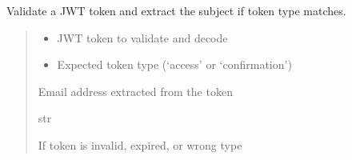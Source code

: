 \documentclass[letterpaper,10pt,openany,oneside,english]{sphinxmanual}
\begin{document}

\begin{savenotes}\begin{fulllineitems}
\label{\detokenize{modules/security:storeapi.security.get_subject_for_token_type}}
\pysigstartsignatures
{}
\pysigstopsignatures
\sphinxAtStartPar
Validate a JWT token and extract the subject if token type matches.
\begin{quote}\begin{description}
\begin{itemize}
\item {} 
\sphinxAtStartPar
{} \textendash{} JWT token to validate and decode

\item {} 
\sphinxAtStartPar
{} \textendash{} Expected token type (‘access’ or ‘confirmation’)

\end{itemize}

\sphinxAtStartPar
Email address extracted from the token

\sphinxAtStartPar
str

\sphinxAtStartPar
{} \textendash{} If token is invalid, expired, or wrong type

\end{description}\end{quote}

\end{fulllineitems}\end{savenotes}

\end{document}

